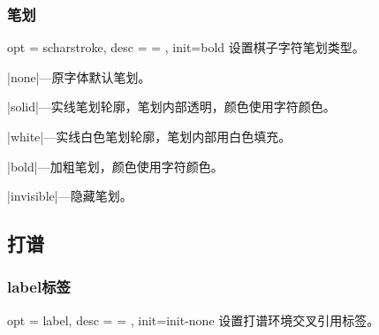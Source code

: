 \documentclass[full]{l3doc}
\begin{document}
\begin{documentation}
\begin{SideBySideExample}[frame=single,numbers=left,
                xrightmargin=.60\linewidth,gobble=2]
  \centering
  \cchessboard[shadow=red!80]
\end{SideBySideExample}

\bigskip

\subsubsection{笔划}

\begin{option}{ opt = scharstroke, desc = {= }, init=bold }
  设置棋子字符笔划类型。
\end{option}

  \begin{Description}[a]
    \item |none|---原字体默认笔划。
    \item |solid|---实线笔划轮廓，笔划内部透明，颜色使用字符颜色。
    \item |white|---实线白色笔划轮廓，笔划内部用白色填充。
    \item |bold|---加粗笔划，颜色使用字符颜色。
    \item |invisible|---隐藏笔划。
  \end{Description}

\begin{SideBySideExample}[frame=single,numbers=left,
                xrightmargin=.58\linewidth,gobble=2]
  \centering
  \cchessboard[charstroke=white,
    redupper=red,blkupper=black]
\end{SideBySideExample}

\bigskip

\subsection{打谱}

\subsubsection{label标签}

\begin{option}{ opt = label, desc = {= }, init=init-none }
  设置打谱环境交叉引用标签。
\end{option}


\end{documentation}
\end{document}
